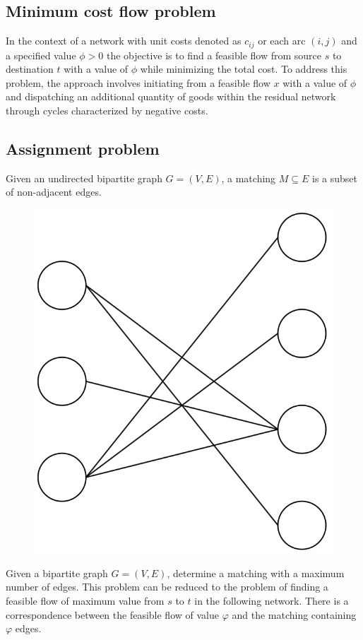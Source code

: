 \subsection{Minimum cost flow problem}
In the context of a network with unit costs denoted as $c_{ij}$ or each arc  $(i,j)$ and a specified value $\phi > 0$ the objective is to find a feasible flow from source $s$ to destination $t$ with a value of $\phi$ while minimizing the total cost.
To address this problem, the approach involves initiating from a feasible flow $x$ with a value of $\phi$ and dispatching an additional quantity of goods within the residual network through cycles characterized by negative costs.

\subsection{Assignment problem}
\begin{definition}
    Given an undirected bipartite graph $G=(V,E)$, a matching $M \subseteq E$ is a subset of non-adjacent edges. 
\end{definition}
\begin{figure}[H]
    \centering
    \includegraphics[width=0.2\linewidth]{images/matching.png}
\end{figure}
Given a bipartite graph $G=(V,E)$, determine a matching with a maximum number of edges. 
This problem can be reduced to the problem of finding a feasible flow of maximum value from $s$ to $t$ in the following network. 
There is a correspondence between the feasible flow of value $\varphi$ and the matching containing $\varphi$ edges. 